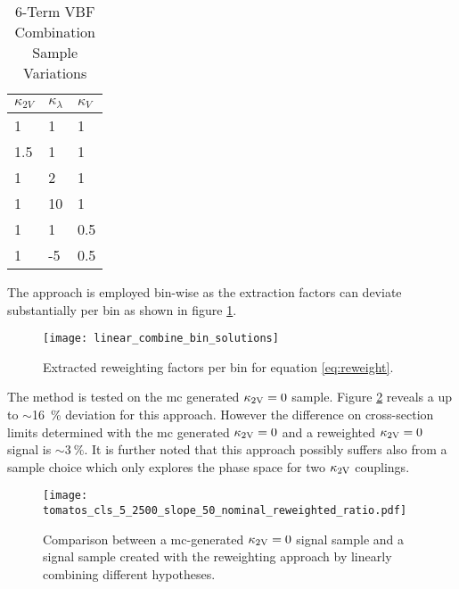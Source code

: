 \begin{table}
    \centering
    \caption{6-Term VBF Combination Sample Variations}
    \label{tab:vbf_hh_6term_varlist}
    \begin{tabular}{ |l|l|l| }
        \hline
        \textbf {$\kappa_{2V}$} & \textbf {$\kappa_\lambda$} & \textbf {$\kappa_V$} \\
        \hline
        1                       & 1                          & 1                    \\
        1.5                     & 1                          & 1                    \\
        1                       & 2                          & 1                    \\
        1                       & 10                         & 1                    \\
        1                       & 1                          & 0.5                  \\
        1                       & -5                         & 0.5                  \\
        \hline
    \end{tabular}
\end{table}
The approach is employed bin-wise as the extraction factors can deviate substantially per bin as shown in figure \ref{fig:linear_combine_bin_solutions}.
\begin{figure}
    \centering
    \texttt{[image: linear\_combine\_bin\_solutions]}
    \caption[]{Extracted reweighting factors per bin for equation \ref{eq:reweight}.}
    \label{fig:linear_combine_bin_solutions}
\end{figure}
The method is tested on the mc generated $\kappa_{\text{2V}}=0$ sample. Figure \ref{fig:tomatos_cls_5_nominal_reweighted_ratio} reveals a up to $\sim$\qty[]{16}{\percent} deviation for this approach. However the difference on cross-section limits determined with the mc generated $\kappa_{\text{2V}}=0$ and a reweighted $\kappa_{\text{2V}}=0$ signal is $\sim\qty[]{3}{\percent}$. It is further noted that this approach possibly suffers also from a sample choice which only explores the phase space for two $\kappa_{\text{2V}}$ couplings.
\begin{figure}
    \centering
    \texttt{[image: tomatos\_cls\_5\_2500\_slope\_50\_nominal\_reweighted\_ratio.pdf]}
    \caption[]{Comparison between a \ac{mc}-generated $\kappa_{\text{2V}}=0$ signal sample and a signal sample created with the reweighting approach by linearly combining different \ktwov hypotheses. }
    \label{fig:tomatos_cls_5_nominal_reweighted_ratio}
\end{figure}






